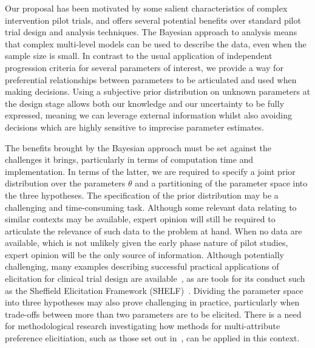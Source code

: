 \documentclass{article} %
\begin{document}
Our proposal has been motivated by some salient characteristics of complex intervention pilot trials, and offers several potential benefits over standard pilot trial design and analysis techniques. The Bayesian approach to analysis means that complex multi-level models can be used to describe the data, even when the sample size is small. In contrast to the usual application of independent progression criteria for several parameters of interest, we provide a way for preferential relationships between parameters to be articulated and used when making decisions. Using a subjective prior distribution on unknown parameters at the design stage allows both our knowledge and our uncertainty to be fully expressed, meaning we can leverage external  information whilst also avoiding decisions which are highly sensitive to imprecise parameter estimates.

The benefits brought by the Bayesian approach must be set against the challenges it brings, particularly in terms of computation time and implementation. In terms of the latter, we are required to specify a joint prior distribution over the parameters $\theta$ and a partitioning of the parameter space into the three hypotheses. The specification of the prior distribution may be a challenging and time-consuming task. Although some relevant data relating to similar contexts may be available, expert opinion will still be required to articulate the relevance of such data to the problem at hand. When no data are available, which is not unlikely given the early phase nature of pilot studies, expert opinion will be the only source of information. Although potentially challenging, many examples describing successful practical applications of elicitation for clinical trial design are available~\cite{Walley2015, Crisp2018, Dallow2018}, as are tools for its conduct such as the Sheffield Elicitation Framework (SHELF)~\cite{OHagan2006a}. Dividing the parameter space into three hypotheses may also prove challenging in practice, particularly when trade-offs between more than two parameters are to be elicited. There is a need for  methodological research investigating how methods for multi-attribute preference elicitiation, such as those set out in~\cite{Keeney1976}, can be applied in this context.

\end{document}
